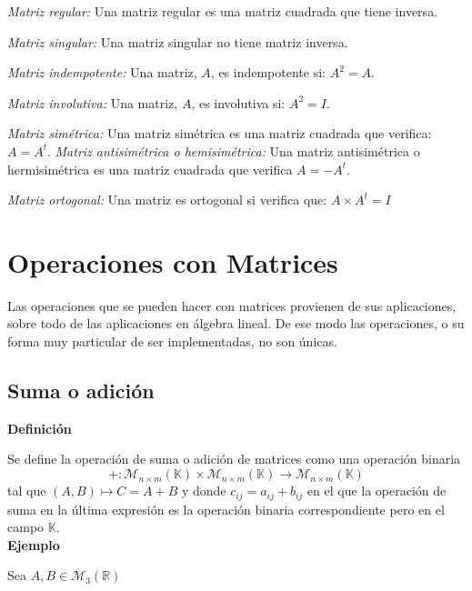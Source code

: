 \begin{itemize}
\textit{Matriz regular:} Una matriz  regular es una matriz cuadrada que tiene inversa.

\textit{Matriz singular:} Una matriz  singular no tiene matriz inversa.

\textit{Matriz indempotente:} Una matriz, $A$, es indempotente si: $A^2 = A$.

\textit{Matriz involutiva:} Una matriz, $A$, es involutiva si: $A^2 = I$.

\textit{Matriz simétrica:} Una matriz simétrica es una matriz cuadrada que verifica: $A = A^t$.
\textit{Matriz antisimétrica o hemisimétrica:} Una matriz antisimétrica o hermisimétrica es una matriz cuadrada que verifica $A = -A^t$.

\textit{Matriz ortogonal:} Una matriz es ortogonal si verifica que: $A\times {A^t} = I$

\end{itemize}

\section{Operaciones con Matrices}
Las operaciones que se pueden hacer con matrices provienen de sus aplicaciones, sobre todo de las aplicaciones en álgebra lineal. De ese modo las operaciones, o su forma muy particular de ser implementadas, no son únicas.

\subsection{Suma o adición}

\noindent \textbf{Definición}

Se define la operación de suma o adición de matrices como una operación binaria
$$
+ : \mathcal{M}_{n\times {m}}(\mathbb{K})\times {\mathcal{M}_{n\times {m}}(\mathbb{K})} \rightarrow \mathcal{M}_{n\times {m}}(\mathbb{K})
$$
tal que $(A, B) \longmapsto C = A+B$ y donde $c_{ij} = a_{ij} + b_{ij}$ en el que la operación de suma en la última expresión es la operación binaria correspondiente pero en el campo $\mathbb{K}$. \\

\noindent \textbf{Ejemplo}

Sea $A, B \in \mathcal{M_3}(\mathbb{R})$

